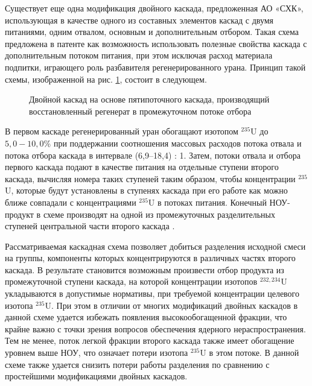 Существует еще одна модификация двойного каскада, предложенная АО «СХК», использующая в качестве одного из составных элементов каскад с двумя питаниями, одним отвалом, основным и дополнительным отбором. Такая схема предложена в патенте \cite{SposobIzotopnogoVosstanovleniyac} как возможность использовать полезные свойства каскада с дополнительным потоком питания, при этом исключая расход материала подпитки, играющего роль разбавителя регенерированного урана. Принцип такой схемы, изображенной на рис. \ref{fig:double_crazy}, состоит в следующем.

\begin{figure}[ht]
  \caption{Двойной каскад на основе пятипоточного каскада, производящий восстановленный регенерат в промежуточном потоке отбора}\label{fig:double_crazy}
\end{figure}

В первом каскаде регенерированный уран обогащают изотопом $^{235}$U до $5,0-10,0$\% при поддержании соотношения массовых расходов потока отвала и потока отбора каскада в интервале (6,9–18,4) : 1. Затем, потоки отвала и отбора первого каскада подают в качестве питания на отдельные ступени второго каскада, вычисляя номера таких ступеней таким образом, чтобы концентрации $^{235}$U, которые будут установлены в ступенях каскада при его работе как можно ближе совпадали с концентрациями $^{235}$U в потоках питания. Конечный НОУ-продукт в схеме производят на одной из промежуточных разделительных ступеней центральной части второго каскада \cite{SposobIzotopnogoVosstanovleniyac}.

Рассматриваемая каскадная схема позволяет добиться разделения исходной смеси на группы, компоненты которых концентрируются в различных частях второго каскада. В результате становится возможным произвести отбор продукта из промежуточной ступени каскада, на которой концентрации изотопов $^{232,234}$U укладываются в допустимые нормативы, при требуемой концентрации целевого изотопа $^{235}$U. При этом в отличии от многих модификаций двойных каскадов в данной схеме удается избежать появления высокообогащенной фракции, что крайне важно с точки зрения вопросов обеспечения ядерного нераспространения. Тем не менее, поток легкой фракции второго каскада также имеет обогащение уровнем выше НОУ, что означает потери изотопа $^{235}$U в этом потоке. В данной схеме также удается снизить потери работы разделения по сравнению с простейшими модификациями двойных каскадов. 

